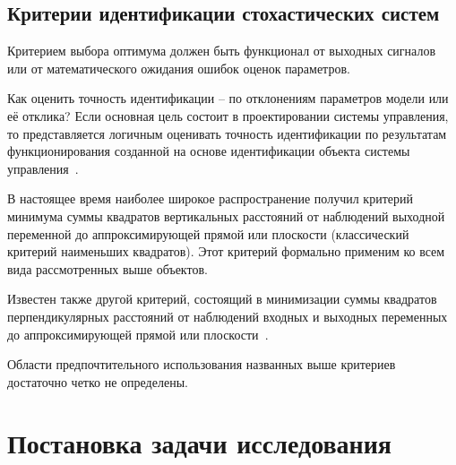 

\newpage
\subsection{Критерии идентификации стохастических систем}

Критерием выбора оптимума должен быть функционал от выходных
сигналов или от математического ожидания ошибок оценок параметров.

Как оценить точность идентификации -- по отклонениям параметров
модели или её отклика? Если основная цель состоит в
проектировании системы управления, то представляется логичным
оценивать точность идентификации по результатам функционирования
созданной на основе идентификации объекта системы управления~\cite{eikhoff_1975}.

В настоящее время наиболее широкое распространение получил критерий
минимума суммы квадратов вертикальных расстояний от наблюдений выходной переменной
до аппроксимирующей прямой или плоскости (классический критерий наименьших квадратов).
Этот критерий формально применим ко всем вида рассмотренных выше объектов.

Известен также другой критерий, состоящий в минимизации суммы квадратов
перпендикулярных расстояний от наблюдений входных и выходных переменных до
аппроксимирующей прямой или плоскости~\cite{pearson_1901, mukha_2016}.

Области предпочтительного использования названных выше критериев
достаточно четко не определены.

\section{Постановка задачи исследования}



